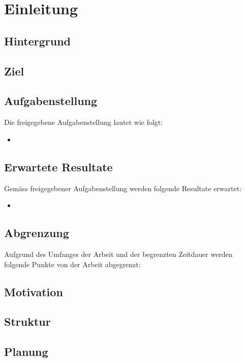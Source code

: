 
\chapter{Einleitung}

\section{Hintergrund}


\section{Ziel}


\section{Aufgabenstellung} \label{sec:Aufgabenstellung}
Die freigegebene Aufgabenstellung lautet wie folgt:

\begin{itemize}
\item 
\end{itemize}


\section{Erwartete Resultate} \label{sec:ErwarteteResultate}
Gemäss freigegebener Aufgabenstellung werden folgende Resultate erwartet:

\begin{itemize}
\item 
\end{itemize}


\section{Abgrenzung} \label{sec:Abgrenzung}
Aufgrund des Umfanges der Arbeit und der begrenzten Zeitdauer werden folgende Punkte von der Arbeit abgegrenzt:

\begin{itemize}

\end{itemize}


\section{Motivation}

\section{Struktur}


\section{Planung} \label{sec:Intro:Planning}
